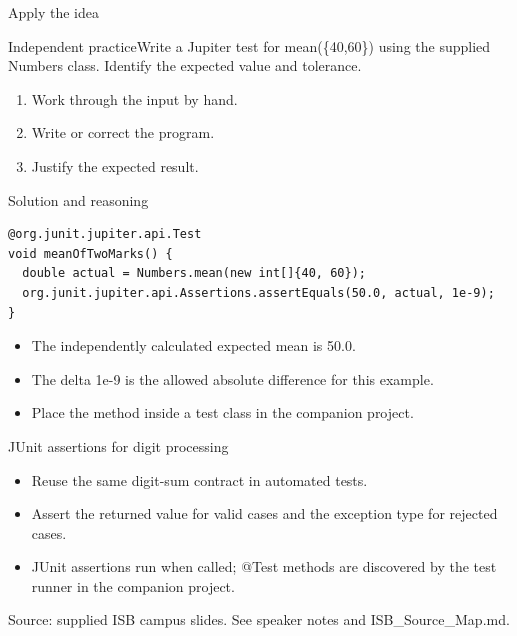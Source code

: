 \documentclass[10pt,aspectratio=169]{beamer}
\begin{document}
\begin{frame}[fragile,t]{Apply the idea}
\begin{alertblock}{Independent practice}Write a Jupiter test for mean(\{40,60\}) using the supplied Numbers class. Identify the expected value and tolerance.\end{alertblock}\vspace{3mm}\begin{enumerate}\item Work through the input by hand.\item Write or correct the program.\item Justify the expected result.\end{enumerate}
\end{frame}

\begin{frame}[fragile,t]{Solution and reasoning}
\begin{lstlisting}
@org.junit.jupiter.api.Test
void meanOfTwoMarks() {
  double actual = Numbers.mean(new int[]{40, 60});
  org.junit.jupiter.api.Assertions.assertEquals(50.0, actual, 1e-9);
}
\end{lstlisting}\vspace{1mm}\small\begin{itemize}
\item The independently calculated expected mean is 50.0.
\item The delta 1e-9 is the allowed absolute difference for this example.
\item Place the method inside a test class in the companion project.
\end{itemize}
\end{frame}

\begin{frame}[fragile,t]{JUnit assertions for digit processing}
\begin{itemize}
\item Reuse the same digit{-}sum contract in automated tests.
\item Assert the returned value for valid cases and the exception type for rejected cases.
\item JUnit assertions run when called; @Test methods are discovered by the test runner in the companion project.
\end{itemize}
\vspace{3mm}\footnotesize\textcolor{accent}{Source: supplied ISB campus slides. See speaker notes and ISB\_Source\_Map.md.}
\end{frame}
\end{document}
